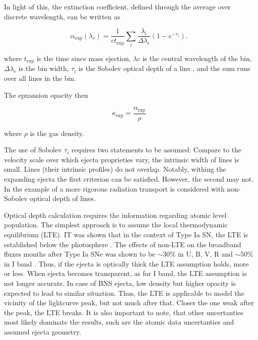 \documentclass[11pt,a4paper,headinclude=true,DIV=14,BCOR=8mm,chapterprefix,listof=totoc,twoside,openright,abstracton]{scrbook}
\begin{document}
In light of this, the extinction coefficient, defined through the average over discrete wavelength, can be written as \cite{Eastman & Pinto (1993)}

\begin{equation}
    \alpha_{\text{exp}}(\lambda_c) = \frac{1}{ct_{\text{exp}}}\sum_i \frac{\lambda_i}{\Delta\lambda_c}(1-e^{-\tau_i}).
\end{equation}

where $t_{\text{exp}}$ is the time since mass ejection, $\lambda{c}$ is the central wavelength of the bin, $\Delta\lambda_c$ is the bin width, $\tau_i$ is the Sobolev optical depth of a line \cite{(Sobolev 1960)}, and the sum runs over all lines in the bin.

The epxansion opacity then

\begin{equation}
    \kappa_{\text{exp}} = \frac{\alpha_{\text{exp}}}{\rho}
\end{equation}

where $\rho$ is the gas density. 

The use of Sobolev $\tau_i$ requires two statements to be assumed:
Compare to the velocity scale over which ejecta proprieties vary, the intrinsic width of lines is small.
Lines (their intrinsic profiles) do not overlap. 
Notably, withing the expanding ejecta the first criterion can be satisfied. However, the second may not. In \cite{Kasen et al. 2013} the example of a more rigorous radiation transport is considered with non-Sobolev optical depth of lines.

Optical depth calculation requires the information regarding atomic level population. The simplest approach is to assume the local thermodynamic equilibrium (LTE).
IT was shown that in the context of Type Ia SN, the LTE is established below the photosphere \cite{Baron et al. (1996),}. The effects of non-LTE on the broadband fluxes months after Type Ia SNe was shown to be $\sim30\%$ in U, B, V, R and $\sim50\%$ in I band \cite{Jack et al. (2011)}. Thus, if the ejecta is optically thick the LTE assumption holds, more or less. When ejecta becomes transparent, as for I band, the LTE assumption is not longer accurate. In case of BNS ejecta, low density but higher opacity is expected to lead to similar situation. Thus, the LTE is applicable to model the vicinity of the lightcurve peak, but not much after that. Closer the one weak after the peak, the LTE breaks. It is also important to note, that other uncertanties most likely dominate the results, such are the atomic data uncertanties and assumed ejecta geometry. 
\end{document}

